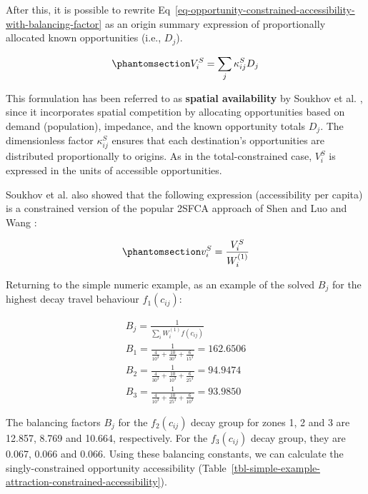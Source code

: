 \documentclass[
  10pt,
  letterpaper,
]{article}
\begin{document}
After this, it is possible to rewrite
Eq~\ref{eq-opportunity-constrained-accessibility-with-balancing-factor}
as an origin summary expression of proportionally allocated known
opportunities (i.e., \(D_j\)).

\begin{equation}\phantomsection\label{eq-attraction-constrained-accessibility-with-proportional-allocation-factor}{
V^S_{i} = \sum_j \kappa^S_{ij} D_j
}\end{equation}

This formulation has been referred to as \textbf{spatial availability}
by Soukhov et al. \citep{soukhovIntroducingSpatialAvailability2023},
since it incorporates spatial competition by allocating opportunities
based on demand (population), impedance, and the known opportunity
totals \(D_j\). The dimensionless factor \(\kappa^S_{ij}\) ensures that
each destination's opportunities are distributed proportionally to
origins. As in the total-constrained case, \(V_i^S\) is expressed in the
units of accessible opportunities.

Soukhov et al. \citep{soukhovIntroducingSpatialAvailability2023} also
showed that the following expression (accessibility per capita) is a
constrained version of the popular 2SFCA approach of Shen
\citep{shen1998} and Luo and Wang \citep{luo2003}:

\begin{equation}\phantomsection\label{eq-opportunity-constrained-accessibility-per-capita}{
v^S_{i} = \frac{V^S_{i}}{W^{(1)}_i}
}\end{equation}

Returning to the simple numeric example, as an example of the solved
\(B_{j}\) for the highest decay travel behaviour \(f_1(c_{ij})\):

\[
\begin{array}{l}
B_{j} = \frac{1}{\sum_i W_i^{(1)} f(c_{ij})}\\
B_{1} =  \frac{1}{\frac{4}{10^3} + \frac{10}{30^3} + \frac{6}{15^3}} = 162.6506\\ 
B_{2} =  \frac{1}{\frac{4}{30^3} + \frac{10}{10^3} + \frac{6}{25^3}} = 94.9474\\
B_{3} =  \frac{1}{\frac{4}{10^3} + \frac{10}{25^3} + \frac{6}{10^3}} = 93.9850
\end{array}
\]

The balancing factors \(B_j\) for the \(f_2(c_{ij})\) decay group for
zones 1, 2 and 3 are 12.857, 8.769 and 10.664, respectively. For the
\(f_3(c_{ij})\) decay group, they are 0.067, 0.066 and 0.066. Using
these balancing constants, we can calculate the singly-constrained
opportunity accessibility
(Table~\ref{tbl-simple-example-attraction-constrained-accessibility}).
\end{document}
